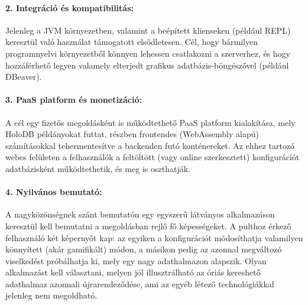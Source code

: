 \documentclass[12pt]{article}
\begin{document}
\paragraph{2. Integráció és kompatibilitás:}{
Jelenleg a JVM környezetben, valamint a beépített klienseken (például REPL) keresztül való használat támogatott elsődletesen.
Cél, hogy bármilyen programnyelvi környezetből könnyen lehessen csatlakozni a szerverhez,
és hogy hozzáférhető legyen valamely elterjedt grafikus adatbázis-böngészővel (például DBeaver).
}

\paragraph{3. PaaS platform és monetizáció:}{
A cél egy fizetős megoldásként is működtethető PaaS platform kialakítása,
mely HoloDB példányokat futtat,
részben frontendes (WebAssembly alapú) számításokkal tehermentesítve a backenden futó konténereket.
Az ehhez tartozó webes felületen a felhasználók a feltöltött (vagy online szerkesztett)
konfigurációt adatbázisként működtethetik, és meg is oszthatják.
}

\paragraph{4. Nyilvános bemutató:}{
A nagyközönségnek szánt bemutatón egy egyszerű látványos alkalmazáson keresztül kell bemutatni a megoldásban rejlő fő képességeket.
A pulthoz érkező felhasználó két képernyőt kap:
az egyiken a konfigurációt módosíthatja valamilyen könnyített (akár gamifikált) módon,
a másikon pedig az azonnal megváltozó viselkedést próbálhatja ki, mely egy nagy adathalmazon alapszik.
Olyan alkalmazást kell választani, melyen jól illusztrálható az óriás kereshető adathalmaz azonnali újrarendeződése,
ami az egyéb létező technológiákkal jelenleg nem megoldható.
}
\end{document}

